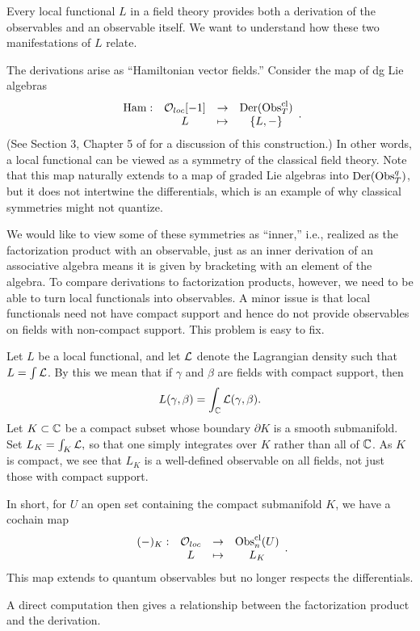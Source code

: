 Every local functional $L$ in a field theory provides both a derivation of the observables 
and an observable itself.
We want to understand how these two manifestations of $L$ relate.

The derivations arise as ``Hamiltonian vector fields.''
Consider the map of dg Lie algebras
\[
\begin{array}{cccc}
{\rm Ham}: & \mathcal O_{loc}[-1] & \to & {\rm Der}({\rm Obs}_T^{\rm cl}) \\
& L & \mapsto & \{L,-\} 
\end{array}.
\]
(See Section 3, Chapter 5 of \cite{CosBook} for a discussion of this construction.)
In other words, a local functional can be viewed as a symmetry of the classical field theory.
Note that this map naturally extends to a map of graded Lie algebras into ${\rm Der}({\rm Obs}_T^q)$,
but it does not intertwine the differentials,
which is an example of why classical symmetries might not quantize.

We would like to view some of these symmetries as ``inner,''
i.e., realized as the factorization product with an observable,
just as an inner derivation of an associative algebra means it is given by bracketing with an element of the algebra.
To compare derivations to factorization products, however, 
we need to be able to turn local functionals into observables.
A minor issue is that local functionals need not have compact support
and hence do not provide observables on fields with non-compact support.
This problem is easy to fix.

Let $L$ be a local functional,
and let $\mathcal L$ denote the Lagrangian density such that $L = \int \mathcal L$.
By this we mean that if $\gamma$ and $\beta$ are fields with compact support, 
then
\[
L(\gamma,\beta) = \int_\mathbb C \mathcal L(\gamma,\beta).
\]
Let $K \subset \mathbb C$ be a compact subset whose boundary $\partial K$ is a smooth submanifold.
Set $L_K = \int_K \mathcal L,$ so that one simply integrates over $K$ rather than all of $\mathbb C$.
As $K$ is compact, we see that $L_K$ is a well-defined observable on all fields, not just those with compact support.

In short, for $U$ an open set containing the compact submanifold $K$, we have a cochain map
\[
\begin{array}{cccc}
(-)_K: & \mathcal O_{loc} & \to & {\rm Obs}_n^{\rm cl}(U) \\
& L & \mapsto & L_K
\end{array}.
\]
This map extends to quantum observables but no longer respects the differentials.

A direct computation then gives a relationship between the factorization product and the derivation.

